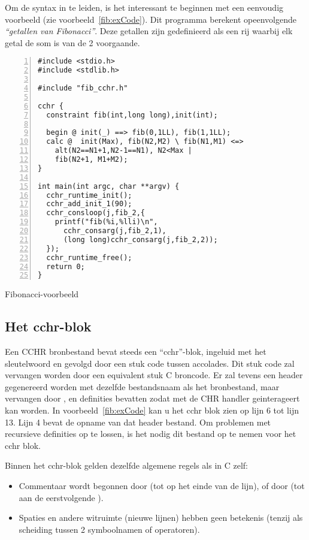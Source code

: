 Om de syntax in te leiden, is het interessant te beginnen met een eenvoudig voorbeeld (zie voorbeeld~\ref{fib:exCode}). Dit programma berekent opeenvolgende {\em ``getallen van Fibonacci''}. Deze getallen zijn gedefinieerd als een rij waarbij elk getal de som is van de 2 voorgaande.

\begin{exCode}
\begin{Verbatim}[frame=single,numbers=left]
#include <stdio.h>
#include <stdlib.h>

#include "fib_cchr.h"

cchr {
  constraint fib(int,long long),init(int);

  begin @ init(_) ==> fib(0,1LL), fib(1,1LL);
  calc @  init(Max), fib(N2,M2) \ fib(N1,M1) <=>
    alt(N2==N1+1,N2-1==N1), N2<Max |
    fib(N2+1, M1+M2);
}

int main(int argc, char **argv) {
  cchr_runtime_init();
  cchr_add_init_1(90);
  cchr_consloop(j,fib_2,{
    printf("fib(%i,%lli)\n", 
      cchr_consarg(j,fib_2,1),
      (long long)cchr_consarg(j,fib_2,2));
  });
  cchr_runtime_free();
  return 0;
}
\end{Verbatim}
\caption{\label{fib:exCode} Fibonacci-voorbeeld}
\end{exCode}

\subsection{Het cchr-blok}

Een CCHR bronbestand bevat steeds een ``cchr''-blok, ingeluid met het sleutelwoord  en gevolgd door een stuk code tussen accolades. Dit stuk code zal vervangen worden door een equivalent stuk C broncode. Er zal tevens een header gegenereerd worden met dezelfde bestandsnaam als het bronbestand, maar  vervangen door , en definities bevatten zodat met de CHR handler geinterageert kan worden. In voorbeeld~\ref{fib:exCode} kan u het cchr blok zien op lijn 6 tot lijn 13. Lijn 4 bevat de opname van dat header bestand. Om problemen met recursieve definities op te lossen, is het nodig dit bestand op te nemen voor het cchr blok.

Binnen het cchr-blok gelden dezelfde algemene regels als in C zelf: \begin{itemize}
  \item Commentaar wordt begonnen door \code{//} (tot op het einde van de lijn), of door \code{/*} (tot aan de eerstvolgende \code{*/}).
  \item Spaties en andere witruimte (nieuwe lijnen) hebben geen betekenis (tenzij als scheiding tussen 2 symboolnamen of operatoren).
\end{itemize}

